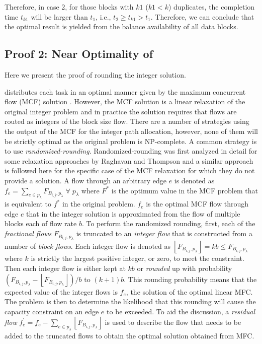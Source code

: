 Therefore, in case 2, for those blocks with $k1$ ($k1<k$) duplicates, the completion time $t_{k1}$ will be larger than $t_1$, i.e., $t_2 \geq t_{k1} > t_1$. Therefore, we can conclude that the optimal result is yielded from the balance availability of all data blocks.

\subsection{Proof 2: Near Optimality of \name}\label{appendix:optimality}

Here we present the proof of rounding the integer solution.

\name distributes each task in an optimal manner given by the maximum concurrent flow (MCF) solution \cite{reed2012traffic}. However, the MCF solution is a linear relaxation of the original integer problem and in practice the solution requires that flows are routed as integers of the block size flow. There are a number of strategies using the output of the MCF for the integer path allocation, however, none of them will be strictly optimal as the original problem is NP-complete. A common strategy is to use \emph{randomized-rounding}. Randomized-rounding was first analyzed in detail for some relaxation approaches by Raghavan and Thompson \cite{Raghavan1987} and a similar approach is followed here for the specific case of the MCF relaxation for which they do not provide a solution. A flow through an arbitrary edge \(e\) is denoted as \(f_e=\sum_{e \in p_\lambda} F_{B_{i,j},p_\lambda} \; \forall \; p_\lambda\) where $F^*$ is the optimum value in the MCF problem that is equivalent to $f^*$ in the original problem. $f_e$ is the optimal MCF flow through edge $e$ that in the integer solution is approximated from the flow of multiple blocks each of flow rate $b$. To perform the randomized rounding, first, each of the \emph{fractional flows}  $F_{B_{i,j},p_\lambda}$ is truncated to an \emph{integer flow} that is constructed from a number of\emph{ block flows}. Each integer flow is denoted as $\left \lfloor F_{B_{i,j},p_\lambda} \right \rfloor = kb \leq F_{B_{i,j},p_\lambda}$ where $k$ is strictly the largest positive integer, or zero, to meet the constraint. Then each integer flow is either kept at $kb$ or \emph{rounded} up with probability $(F_{B_{i,j},p_\lambda} - \left \lfloor{F_{B_{i,j},p_\lambda}} \right \rfloor)/b$ to $(k+1)b$. This rounding probability means that the expected value of the integer flows is $f_e$, the solution of the optimal linear MFC. The problem is then to determine the likelihood that this rounding will cause the capacity constraint on an edge $e$ to be exceeded. To aid the discussion, a \emph{residual flow}  $f^\prime_e=f_e - \sum_{e \in p_\lambda} \left \lfloor{F_{B_{i,j},p_\lambda}} \right \rfloor $ is used to describe the flow that needs to be added to the truncated flows to obtain the optimal solution obtained from MFC.

